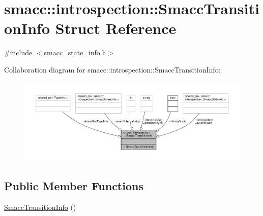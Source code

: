 \hypertarget{structsmacc_1_1introspection_1_1SmaccTransitionInfo}{}\section{smacc\+:\+:introspection\+:\+:Smacc\+Transition\+Info Struct Reference}
\label{structsmacc_1_1introspection_1_1SmaccTransitionInfo}


{\ttfamily \#include $<$smacc\+\_\+state\+\_\+info.\+h$>$}



Collaboration diagram for smacc\+:\+:introspection\+:\+:Smacc\+Transition\+Info\+:\nopagebreak
\begin{figure}[H]
\begin{center}
\leavevmode
\includegraphics[width=350pt]{structsmacc_1_1introspection_1_1SmaccTransitionInfo__coll__graph}
\end{center}
\end{figure}
\subsection*{Public Member Functions}
\begin{DoxyCompactItemize}
\item 
\hyperlink{structsmacc_1_1introspection_1_1SmaccTransitionInfo_ad9f52aaeeecec400ac9419cc69054204}{Smacc\+Transition\+Info} ()
\end{DoxyCompactItemize}

